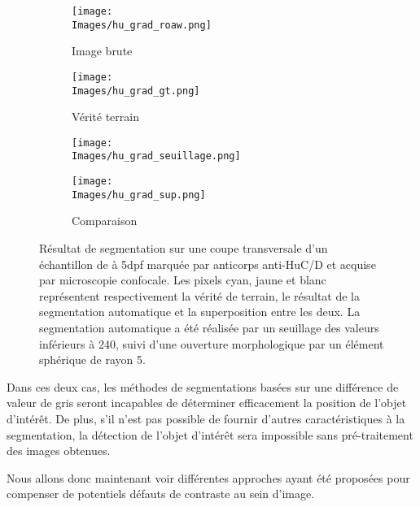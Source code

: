 \documentclass[\main/main.tex]{subfiles}
\providecommand{\Images}{\main/Figures/intro_seg}
\begin{document}
\begin{figure}[h]
\begin{center}
    \begin{subfigure}[b]{0.2245\textwidth}
        \caption{
        Image brute
            }
       \centering \texttt{[image: \\Images/hu\_grad\_roaw.png]}
    \end{subfigure}
    \begin{subfigure}[b]{0.2245\textwidth}
        \caption{
        Vérité terrain
            }
       \centering \texttt{[image: \\Images/hu\_grad\_gt.png]}
    \end{subfigure}
    \begin{subfigure}[b]{0.2245\textwidth}
        \caption{
            }
       \centering \texttt{[image: \\Images/hu\_grad\_seuillage.png]}
    \end{subfigure}
    \begin{subfigure}[b]{0.2245\textwidth}
        \caption{
            Comparaison
            }
       \centering \texttt{[image: \\Images/hu\_grad\_sup.png]}
    \end{subfigure}
    \caption{
    \label{apriori:grad}
        Résultat de segmentation sur une coupe transversale d'un échantillon de \pz à 5dpf marquée par anticorps anti\hyp{}HuC/D et acquise par microscopie confocale.
        Les pixels cyan, jaune et blanc représentent respectivement la vérité de terrain,
        le résultat de la segmentation automatique et la superposition entre les deux.
        La segmentation automatique a été réalisée par un seuillage des valeurs inférieurs à 240, suivi d'une ouverture morphologique par un élément sphérique de rayon 5.
    }
\end{center}
\end{figure}

Dans ces deux cas, les méthodes de segmentations basées sur une différence de valeur de gris seront incapables de déterminer efficacement la position de l'objet d'intérêt.
%
De plus, s'il n'est pas possible de fournir d'autres caractéristiques à la segmentation, la détection de l'objet d'intérêt sera impossible sans pré\hyp{}traitement des images obtenues.

%
Nous allons donc maintenant voir différentes approches ayant été proposées pour compenser de potentiels défauts de contraste au sein d'image.
\end{document}
